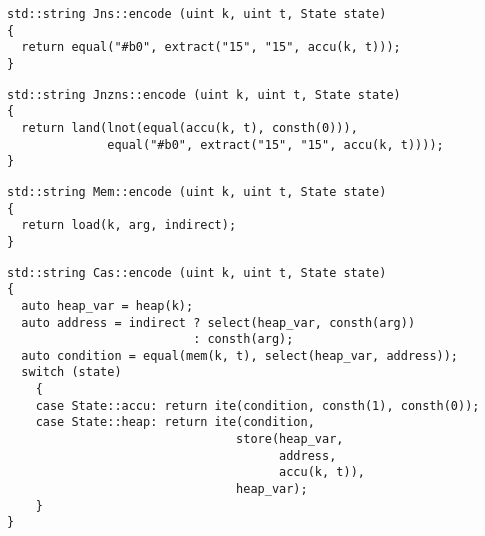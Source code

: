 \newpage

\begin{lstlisting}[style=c++, style=encode]
std::string Jns::encode (uint k, uint t, State state)
{
  return equal("#b0", extract("15", "15", accu(k, t)));
}
\end{lstlisting}


\begin{lstlisting}[style=c++, style=encode]
std::string Jnzns::encode (uint k, uint t, State state)
{
  return land(lnot(equal(accu(k, t), consth(0))),
              equal("#b0", extract("15", "15", accu(k, t))));
}
\end{lstlisting}


\begin{lstlisting}[style=c++, style=encode]
std::string Mem::encode (uint k, uint t, State state)
{
  return load(k, arg, indirect);
}
\end{lstlisting}


\begin{lstlisting}[style=c++, style=encode]
std::string Cas::encode (uint k, uint t, State state)
{
  auto heap_var = heap(k);
  auto address = indirect ? select(heap_var, consth(arg))
                          : consth(arg);
  auto condition = equal(mem(k, t), select(heap_var, address));
  switch (state)
    {
    case State::accu: return ite(condition, consth(1), consth(0));
    case State::heap: return ite(condition,
                                store(heap_var,
                                      address,
                                      accu(k, t)),
                                heap_var);
    }
}
\end{lstlisting}

